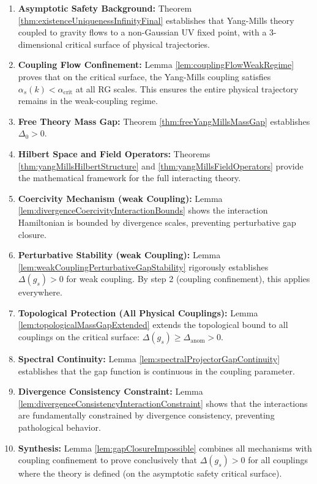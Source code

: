 \begin{enumerate}

\item \textbf{Asymptotic Safety Background:}
Theorem \ref{thm:existenceUniquenessInfinityFinal} establishes that Yang-Mills theory 
coupled to gravity flows to a non-Gaussian UV fixed point, with a 3-dimensional critical surface 
of physical trajectories.

\item \textbf{Coupling Flow Confinement:}
Lemma \ref{lem:couplingFlowWeakRegime} proves that on the critical surface, 
the Yang-Mills coupling satisfies $\alpha_s(k) < \alpha_{\text{crit}}$ at all RG scales. 
This ensures the entire physical trajectory remains in the weak-coupling regime.

\item \textbf{Free Theory Mass Gap:}
Theorem \ref{thm:freeYangMillsMassGap} establishes $\Delta_0 > 0$.

\item \textbf{Hilbert Space and Field Operators:}
Theorems \ref{thm:yangMillsHilbertStructure} and \ref{thm:yangMillsFieldOperators} 
provide the mathematical framework for the full interacting theory.

\item \textbf{Coercivity Mechanism (weak Coupling):}
Lemma \ref{lem:divergenceCoercivityInteractionBounds} shows the interaction Hamiltonian 
is bounded by divergence scales, preventing perturbative gap closure.

\item \textbf{Perturbative Stability (weak Coupling):}
Lemma \ref{lem:weakCouplingPerturbativeGapStability} rigorously establishes 
$\Delta(g_s) > 0$ for weak coupling. By step 2 (coupling confinement), this applies everywhere.

\item \textbf{Topological Protection (All Physical Couplings):}
Lemma \ref{lem:topologicalMassGapExtended} extends the topological bound to all couplings 
on the critical surface: $\Delta(g_s) \geq \Delta_{\text{anom}} > 0$.

\item \textbf{Spectral Continuity:}
Lemma \ref{lem:spectralProjectorGapContinuity} establishes that the gap function 
is continuous in the coupling parameter.

\item \textbf{Divergence Consistency Constraint:}
Lemma \ref{lem:divergenceConsistencyInteractionConstraint} shows that the interactions 
are fundamentally constrained by divergence consistency, preventing pathological behavior.

\item \textbf{Synthesis:}
Lemma \ref{lem:gapClosureImpossible} combines all mechanisms with coupling confinement 
to prove conclusively that $\Delta(g_s) > 0$ for all couplings where the theory is defined 
(on the asymptotic safety critical surface).

\end{enumerate}

